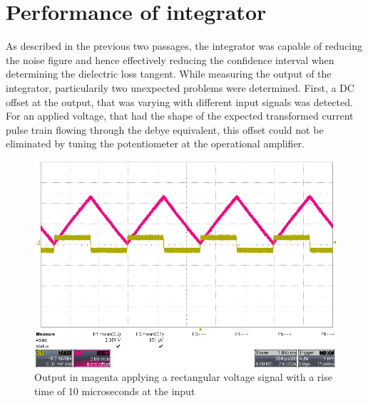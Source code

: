 \section{Performance of integrator}
As described in the previous two passages, the integrator was capable of reducing the noise figure and hence effectively reducing 
the confidence interval when determining the dielectric loss tangent. While measuring the output of the integrator, particularily two unexpected problems were determined.
First, a DC offset at the output, that was varying with different input signals was detected. For an applied voltage, that had the shape of the expected transformed current pulse train
flowing through the debye equivalent, this offset could not be eliminated by tuning the potentiometer at the operational amplifier.

\begin{figure}[htbp]
 \centering
 \centerline{\includegraphics[scale=0.3]{figures/Results/Integrator_measurements/voltwave_10us}}

  \caption[Kurze Abbildungsbeschreibung]{Output in magenta applying a rectangular voltage signal with a rise time of 10 microseconds at the input}
\label{fig.voltwave_10us}
\end{figure}

